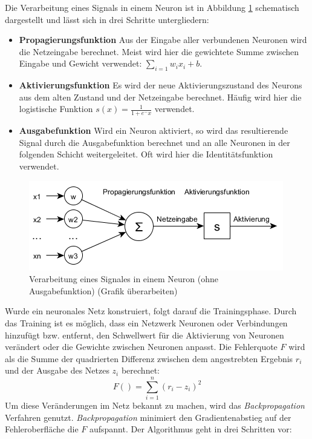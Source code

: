 Die Verarbeitung eines Signals in einem Neuron ist in Abbildung \ref{img:neuron} schematisch dargestellt und lässt sich in drei Schritte untergliedern:
\begin{itemize}
	\item \textbf{Propagierungsfunktion} Aus der Eingabe aller verbundenen Neuronen wird die Netzeingabe berechnet. Meist wird hier die gewichtete Summe zwischen Eingabe und Gewicht verwendet: $\sum_{i=1}^{} w_{i}x_{i} + b$.
	\item \textbf{Aktivierungsfunktion} Es wird der neue Aktivierungszustand des Neurons aus dem alten Zustand und der Netzeingabe berechnet. Häufig wird hier die logistische Funktion $s(x) = \frac{1}{1+e^-x}$ verwendet.
	\item \textbf{Ausgabefunktion} Wird ein Neuron aktiviert, so wird das resultierende Signal durch die Ausgabefunktion berechnet und an alle Neuronen in der folgenden Schicht weitergeleitet. Oft wird hier die Identitätsfunktion verwendet.
\end{itemize}

\begin{figure}
	\centering
	\includegraphics[scale=1.0]{images/neuron.png}
	\caption{Verarbeitung eines Signales in einem Neuron (ohne Ausgabefunktion) (Grafik überarbeiten)}
	\label{img:neuron}
\end{figure}

Wurde ein neuronales Netz konstruiert, folgt darauf die Trainingsphase. Durch das Training ist es möglich, dass ein Netzwerk Neuronen oder Verbindungen hinzufügt bzw. entfernt, den Schwellwert für die Aktivierung von Neuronen verändert oder die Gewichte zwischen Neuronen anpasst. Die Fehlerquote $F$ wird als die Summe der quadrierten Differenz zwischen dem angestrebten Ergebnis $r_{i}$ und der Ausgabe des Netzes $z_{i}$ berechnet:
$$ F()=\sum_{i=1}^{n} (r_{i} - z_{i})^2 $$
Um diese Veränderungen im Netz bekannt zu machen, wird das \textit{Backpropagation} Verfahren genutzt. \textit{Backpropagation} minimiert den Gradientenabstieg auf der Fehleroberfläche die $F$ aufspannt. Der Algorithmus geht in drei Schritten vor:

